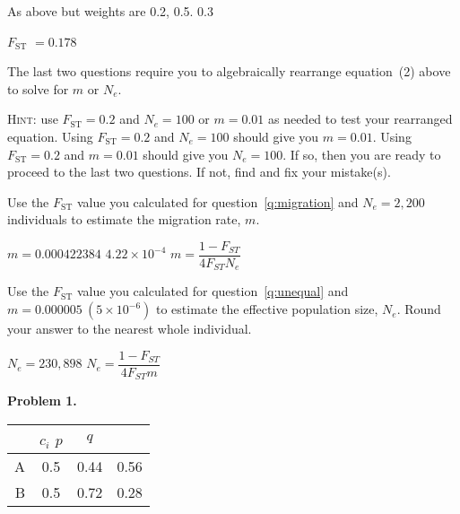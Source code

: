 \documentclass[12pt, addpoints, hidelinks]{exam}
\newcommand{\fst}{$F_{\mathrm{ST}}$}
\begin{document}
\begin{questions}
\begin{multicols}{2}
\columnbreak

\ifprintanswers 

As above but weights are 0.2, 0.5. 0.3 

\fst{} $= 0.178$ \else \phantom{\fst{} $= 0.178$} \fi

\end{multicols}
	
\newpage

The last two questions require you to algebraically rearrange equation~(2) above to solve for $m$ or $N_e$.

\textsc{Hint:} use $F_\mathrm{ST} = 0.2$ and $N_e = 100$ or $m = 0.01$ as needed to test your rearranged equation. Using $F_\mathrm{ST} = 0.2$ and $N_e = 100$ should give you $m = 0.01$. Using $F_\mathrm{ST} = 0.2$ and $m = 0.01$ should give you $N_e = 100$. If so, then you are ready to proceed to the last two questions. If not, find and fix your mistake(s).

\question[4]
Use the \fst{} value you calculated for question~\ref{q:migration} and $N_e = 2,200$ individuals to estimate the migration rate, $m$. 

\ifprintanswers 
	$m = 0.000422384$ \quad $4.22 \times 10^{-4}$ \hfill $m = \dfrac{1-F_{ST}}{4F_{ST}N_e}$
	
	\vspace{2\baselineskip} 
\else 
	\vspace{3\baselineskip}
\fi

\question[4]
Use the \fst{} value you calculated for question~\ref{q:unequal} and $m = 0.000005\ (5\times 10^{-6})$ to estimate the effective population size, $N_e$. Round your answer to the nearest whole individual.

\ifprintanswers 
	$N_e = 230,898$ \hfill $N_e = \dfrac{1-F_{ST}}{4F_{ST}m}$\newline
	\vspace{\baselineskip}
\else 
	\vspace{2\baselineskip} 
\fi

\ifprintanswers

\newpage

\begin{multicols}{2}

\textbf{Problem 1.}

	\begin{tabular}{rccc}
	\toprule
	& $c_i$ $p$ & $q$  \tabularnewline
	\midrule
	A & 0.5 & 0.44 & 0.56  \tabularnewline
	B & 0.5 & 0.72 & 0.28  \tabularnewline
	\bottomrule

\end{tabular}


\end{multicols}
\end{questions}
\end{document}
